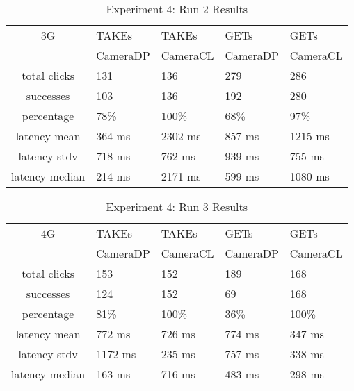 \begin{table}[htb]
\begin{scriptsize} 
\caption{Experiment 4: Run 2 Results} 
\label{table:exp-4-run2-results}
 \begin{center}
 \begin{tabular}{| c | p{1.5cm} | p{1.5cm} | p{1.5cm} | p{1.4cm} |}
  \hline
  3G & TAKEs & TAKEs & GETs & GETs \\
  & CameraDP & CameraCL & CameraDP & CameraCL \\
  \hline
  total clicks & 131 & 136 & 279 & 286 \\
  \hline
  successes & 103 & 136 & 192 & 280 \\
  \hline
  percentage & 78\% & 100\% & 68\% & 97\% \\
  \hline
  latency mean & 364 ms & 2302 ms & 857 ms & 1215 ms \\
  \hline
  latency stdv & 718 ms & 762 ms & 939 ms & 755 ms \\
  \hline
  latency median & 214 ms & 2171 ms & 599 ms & 1080 ms \\
  \hline
  \end{tabular}

  \end{center}
\end{scriptsize}
\end{table}

\begin{table}[htb]
\begin{scriptsize} 
\caption{Experiment 4: Run 3 Results} 
\label{table:exp-4-run3-results}
 \begin{center}
 \begin{tabular}{| c | p{1.5cm} | p{1.5cm} | p{1.5cm} | p{1.4cm} |}
  \hline
  4G & TAKEs & TAKEs & GETs & GETs \\
  & CameraDP & CameraCL & CameraDP & CameraCL \\
  \hline
  total clicks & 153 & 152 & 189 & 168 \\
  \hline
  successes & 124 & 152 & 69 & 168 \\
  \hline
  percentage & 81\% & 100\% & 36\% & 100\% \\
  \hline
  latency mean & 772 ms & 726 ms & 774 ms & 347 ms \\
  \hline
  latency stdv & 1172 ms & 235 ms & 757 ms & 338 ms \\
  \hline
  latency median & 163 ms & 716 ms & 483 ms & 298 ms \\
  \hline
  \end{tabular}
  \end{center}
\end{scriptsize}
\end{table}

